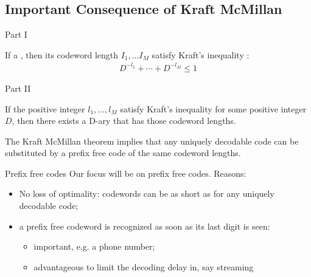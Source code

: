 \subsection{Important Consequence of Kraft McMillan}
\begin{parag}{Part I}
\begin{theoreme}
    If a , then its codeword length $I_1, \dots I_M$ satisfy Kraft's inequality : 
    \begin{align*}
        D^{-l_1} + \cdots  + D^{-l_M} \leq 1
    \end{align*}
    
\end{theoreme}

\end{parag}
\begin{parag}{Part II}
    \begin{theoreme}
        If the positive integer $l_1, \dots, l_M$ satisfy Kraft's inequality for some positive integer $D$, then there exists a D-ary  that has those codeword lengths.
    \end{theoreme}
   The Kraft McMillan theorem implies that any uniquely decodable code can be substituted by a prefix free code of the same codeword lengths. 

\end{parag}

\begin{parag}{Prefix free codes}
    Our focus will be on prefix free codes. Reasons:
    \begin{itemize}
        \item No loss of optimality: codewords can be as short as for any uniquely decodable code;
        \item a prefix free codeword is recognized as soon as its last digit is seen:
            \begin{itemize}
                \item important, e.g. a phone number;
                \item advantageous to limit the decoding delay in, say streaming
            \end{itemize}
    \end{itemize}
\end{parag}

